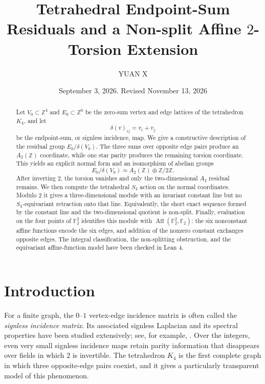 \documentclass[11pt]{amsart}
\title[Tetrahedral endpoint-sum residuals]{Tetrahedral Endpoint-Sum Residuals and a Non-split Affine $2$-Torsion Extension}
\author{YUAN X}
\date{September 3, 2026. Revised November 13, 2026}
\theoremstyle{definition}
\theoremstyle{remark}
\newcommand{\Z}{\mathbb Z}
\newcommand{\F}{\mathbb F}
\newcommand{\Aff}{\operatorname{Aff}}
\begin{document}
\begin{abstract}
Let $V_0\subset \Z^4$ and $E_0\subset \Z^6$ be the zero-sum vertex and edge lattices of the tetrahedron $K_4$, and let
\[
  \delta(v)_{ij}=v_i+v_j
\]
be the endpoint-sum, or signless incidence, map. We give a constructive description of the residual group $E_0/\delta(V_0)$. The three sums over opposite edge pairs produce an $A_2(\Z)$ coordinate, while one star parity produces the remaining torsion coordinate. This yields an explicit normal form and an isomorphism of abelian groups
\[
  E_0/\delta(V_0)\simeq A_2(\Z)\oplus \Z/2\Z.
\]
After inverting $2$, the torsion vanishes and only the two-dimensional $A_2$ residual remains. We then compute the tetrahedral $S_4$ action on the normal coordinates. Modulo $2$ it gives a three-dimensional module with an invariant constant line but no $S_4$-equivariant retraction onto that line. Equivalently, the short exact sequence formed by the constant line and the two-dimensional quotient is non-split. Finally, evaluation on the four points of $\F_2^2$ identifies this module with $\Aff(\F_2^2,\F_2)$: the six nonconstant affine functions encode the six edges, and addition of the nonzero constant exchanges opposite edges. The integral classification, the non-splitting obstruction, and the equivariant affine-function model have been checked in Lean 4.
\end{abstract}

\maketitle

\section{Introduction}

For a finite graph, the $0$--$1$ vertex-edge incidence matrix is often called the \emph{signless incidence matrix}. Its associated signless Laplacian and its spectral properties have been studied extensively; see, for example, \cite{CvetkovicRowlinsonSimic}. Over the integers, even very small signless incidence maps retain parity information that disappears over fields in which $2$ is invertible. The tetrahedron $K_4$ is the first complete graph in which three opposite-edge pairs coexist, and it gives a particularly transparent model of this phenomenon.
\end{document}
